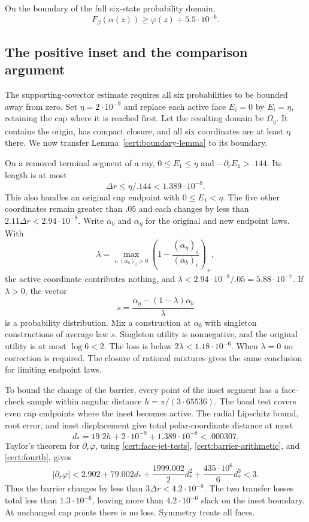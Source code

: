 \begin{lemma}\label{cert:boundary-lemma}
On the boundary of the full six-state probability domain,
\[
 F_\beta(\alpha(z))\geq\varphi(z)+5.5\cdot10^{-6}.
\]
\end{lemma}

\subsection{The positive inset and the comparison argument}
\label{cert:inset}

The supporting-covector estimate requires all six probabilities to be
bounded away from zero.  Set $\eta=2\cdot10^{-9}$ and replace each active
face $E_i=0$ by $E_i=\eta$, retaining the cap where it is reached first.
Let the resulting domain be $\Omega_\eta$.  It contains the origin,
has compact closure, and all six coordinates are at least $\eta$ there.
We now transfer Lemma~\ref{cert:boundary-lemma} to its boundary.

On a removed terminal segment of a ray,
$0\leq E_1\leq\eta$ and $-\partial_rE_1>.144$.  Its length is at most
\begin{equation}\label{cert:inset-distance}
 \Delta r\leq\eta/.144<1.389\cdot10^{-8}.
\end{equation}
This also handles an original cap endpoint with $0\leq E_1<\eta$.
The five other coordinates remain greater than $.05$ and each changes
by less than $2.11\Delta r<2.94\cdot10^{-8}$.  Write $\alpha_b$ and
$\alpha_\eta$ for the original and new endpoint laws.  With
\[
 \lambda=\max_{i:(\alpha_b)_i>0}
             \left(1-\frac{(\alpha_\eta)_i}{(\alpha_b)_i}\right)_+,
\]
the active coordinate contributes nothing, and
$\lambda<2.94\cdot10^{-8}/.05=5.88\cdot10^{-7}$.
If $\lambda>0$, the vector
\[
 s=\frac{\alpha_\eta-(1-\lambda)\alpha_b}{\lambda}
\]
is a probability distribution.  Mix a construction at $\alpha_b$ with
singleton constructions of average law $s$.  Singleton utility is
nonnegative, and the original utility is at most $\log6<2$.
The loss is below $2\lambda<1.18\cdot10^{-6}$.  When $\lambda=0$ no
correction is required.  The closure of rational mixtures gives the
same conclusion for limiting endpoint laws.

To bound the change of the barrier, every point of the inset segment has
a face-check sample within angular distance $h=\pi/(3\cdot65536)$.
The band test covers even cap endpoints where the inset becomes active.
The radial Lipschitz bound, root error, and inset displacement give total
polar-coordinate distance at most
\[
 d_*=19.2h+2\cdot10^{-9}+1.389\cdot10^{-8}<.000307.
\]
Taylor's theorem for $\partial_r\varphi$, using
\eqref{cert:face-jet-tests}, \eqref{cert:barrier-arithmetic}, and
\eqref{cert:fourth}, gives
\[
 |\partial_r\varphi|
 <2.902+79.002d_*+\frac{1999.002}{2}d_*^2
                         +\frac{435\cdot10^6}{6}d_*^3<3.
\]
Thus the barrier changes by less than $3\Delta r<4.2\cdot10^{-8}$.
The two transfer losses total less than $1.3\cdot10^{-6}$, leaving
more than $4.2\cdot10^{-6}$ slack on the inset boundary.  At unchanged
cap points there is no loss.  Symmetry treats all faces.

